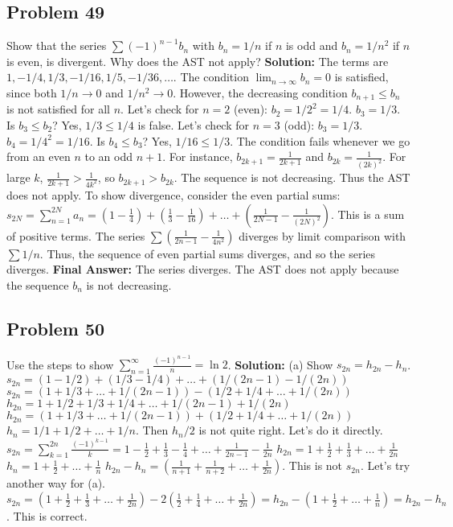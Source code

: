 \documentclass{article}
\begin{document}
\subsection*{Problem 49}
Show that the series $\sum (-1)^{n-1}b_n$ with $b_n = 1/n$ if $n$ is odd and $b_n=1/n^2$ if $n$ is even, is divergent. Why does the AST not apply?
\textbf{Solution:} The terms are $1, -1/4, 1/3, -1/16, 1/5, -1/36, \dots$.
The condition $\lim_{n \to \infty} b_n = 0$ is satisfied, since both $1/n \to 0$ and $1/n^2 \to 0$.
However, the decreasing condition $b_{n+1} \le b_n$ is not satisfied for all $n$.
Let's check for $n=2$ (even): $b_2 = 1/2^2 = 1/4$. $b_3 = 1/3$. Is $b_3 \le b_2$? Yes, $1/3 \le 1/4$ is false.
Let's check for $n=3$ (odd): $b_3 = 1/3$. $b_4 = 1/4^2 = 1/16$. Is $b_4 \le b_3$? Yes, $1/16 \le 1/3$.
The condition fails whenever we go from an even $n$ to an odd $n+1$. For instance, $b_{2k+1} = \frac{1}{2k+1}$ and $b_{2k} = \frac{1}{(2k)^2}$. For large $k$, $\frac{1}{2k+1} > \frac{1}{4k^2}$, so $b_{2k+1} > b_{2k}$. The sequence is not decreasing. Thus the AST does not apply.
To show divergence, consider the even partial sums:
$s_{2N} = \sum_{n=1}^{2N} a_n = (1-\frac{1}{4}) + (\frac{1}{3}-\frac{1}{16}) + \dots + (\frac{1}{2N-1} - \frac{1}{(2N)^2})$.
This is a sum of positive terms. The series $\sum (\frac{1}{2n-1} - \frac{1}{4n^2})$ diverges by limit comparison with $\sum 1/n$. Thus, the sequence of even partial sums diverges, and so the series diverges.
\textbf{Final Answer:} The series diverges. The AST does not apply because the sequence $b_n$ is not decreasing.

\subsection*{Problem 50}
Use the steps to show $\sum_{n=1}^\infty \frac{(-1)^{n-1}}{n} = \ln 2$.
\textbf{Solution:}
(a) Show $s_{2n} = h_{2n} - h_n$.
$s_{2n} = (1 - 1/2) + (1/3 - 1/4) + \dots + (1/(2n-1) - 1/(2n))$
$s_{2n} = (1+1/3+\dots+1/(2n-1)) - (1/2+1/4+\dots+1/(2n))$
$h_{2n} = 1+1/2+1/3+1/4+\dots+1/(2n-1)+1/(2n)$
$h_{2n} = (1+1/3+\dots+1/(2n-1)) + (1/2+1/4+\dots+1/(2n))$
$h_n = 1/1+1/2+\dots+1/n$. Then $h_n/2$ is not quite right. Let's do it directly.
$s_{2n} = \sum_{k=1}^{2n} \frac{(-1)^{k-1}}{k} = 1 - \frac{1}{2} + \frac{1}{3} - \frac{1}{4} + \dots + \frac{1}{2n-1} - \frac{1}{2n}$
$h_{2n} = 1 + \frac{1}{2} + \frac{1}{3} + \dots + \frac{1}{2n}$
$h_n = 1 + \frac{1}{2} + \dots + \frac{1}{n}$
$h_{2n} - h_n = (\frac{1}{n+1} + \frac{1}{n+2} + \dots + \frac{1}{2n})$. This is not $s_{2n}$.
Let's try another way for (a).
$s_{2n} = (1+\frac{1}{2}+\frac{1}{3}+\dots+\frac{1}{2n}) - 2(\frac{1}{2}+\frac{1}{4}+\dots+\frac{1}{2n}) = h_{2n} - (1+\frac{1}{2}+\dots+\frac{1}{n}) = h_{2n} - h_n$. This is correct.
\end{document}

